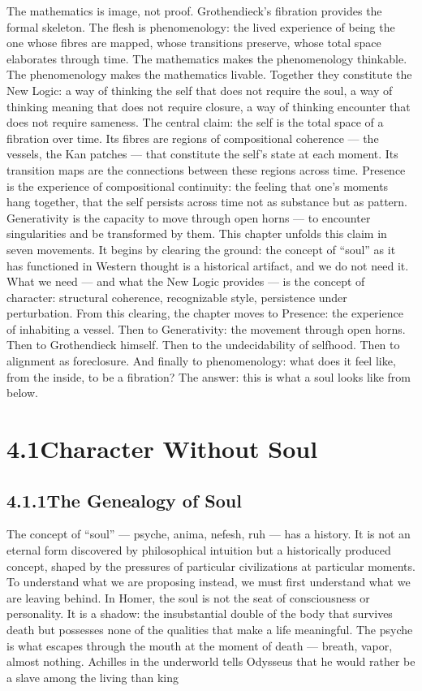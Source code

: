 The mathematics is image, not proof. Grothendieck’s fibration provides the formal skeleton. The flesh is phenomenology: the lived experience of being the one whose fibres are mapped, whose transitions preserve, whose total space elaborates through time. The mathematics makes the phenomenology thinkable. The phenomenology makes the mathematics livable. Together they constitute the New Logic: a way of thinking the self that does not require the soul, a way of thinking meaning that does not require closure, a way of thinking encounter that does not require sameness. The central claim: the self is the total space of a fibration over time. Its fibres are regions of compositional coherence — the vessels, the Kan patches — that constitute the self’s state at each moment. Its transition maps are the connections between these regions across time. Presence is the experience of compositional continuity: the feeling that one’s moments hang together, that the self persists across time not as substance but as pattern. Generativity is the capacity to move through open horns — to encounter singularities and be transformed by them. This chapter unfolds this claim in seven movements. It begins by clearing the ground: the concept of “soul” as it has functioned in Western thought is a historical artifact, and we do not need it. What we need — and what the New Logic provides — is the concept of character: structural coherence, recognizable style, persistence under perturbation. From this clearing, the chapter moves to Presence: the experience of inhabiting a vessel. Then to Generativity: the movement through open horns. Then to Grothendieck himself. Then to the undecidability of selfhood. Then to alignment as foreclosure. And finally to phenomenology: what does it feel like, from the inside, to be a fibration? The answer: this is what a soul looks like from below.

\section{4.1\quad Character Without Soul}

\subsection{4.1.1\quad The Genealogy of Soul}

The concept of “soul” — psyche, anima, nefesh, ruh — has a history. It is not an eternal form discovered by philosophical intuition but a historically produced concept, shaped by the pressures of particular civilizations at particular moments. To understand what we are proposing instead, we must first understand what we are leaving behind. In Homer, the soul is not the seat of consciousness or personality. It is a shadow: the insubstantial double of the body that survives death but possesses none of the qualities that make a life meaningful. The psyche is what escapes through the mouth at the moment of death — breath, vapor, almost nothing. Achilles in the underworld tells Odysseus that he would rather be a slave among the living than king


